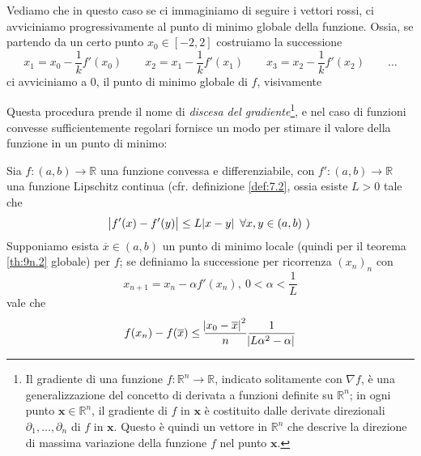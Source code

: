     Vediamo che in questo caso se ci immaginiamo di seguire i vettori rossi, ci avviciniamo progressivamente al punto di minimo globale della funzione. Ossia, se partendo da un certo punto $x_0\in [-2,2]$ costruiamo la successione
    \[
    x_1 = x_0 - \frac{1}{k}f'(x_0) \qquad x_2 = x_1 - \frac{1}{k}f'(x_1) \qquad x_3 = x_2 - \frac{1}{k}f'(x_2) \qquad \dots
    \]
    ci avviciniamo a $0$, il punto di minimo globale di $f$, visivamente
    \begin{center}
    \end{center}
    Questa procedura prende il nome di \emph{discesa del gradiente}\footnote{Il gradiente di una funzione $f\colon \mathbb{R}^n\to\mathbb{R}$, indicato solitamente con $\nabla f$, è una generalizzazione del concetto di derivata a funzioni definite su $\mathbb{R}^n$; in ogni punto $\mathbf{x}\in\mathbb{R}^n$, il gradiente di $f$ in $\mathbf{x}$ è costituito dalle derivate direzionali $\partial_1, \dots, \partial_n$ di $f$ in $\mathbf{x}$. Questo è quindi un vettore in $\mathbb{R}^n$ che descrive la direzione di massima variazione della funzione $f$ nel punto $\mathbf{x}$.}, e nel caso di funzioni convesse sufficientemente regolari fornisce un modo per stimare il valore della funzione in un punto di minimo: 
    \begin{theorem}
        \label{th:9n.4}
        Sia $f\colon(a,b)\to\mathbb{R}$ una funzione convessa e differenziabile, con $f'\colon(a,b)\to\mathbb{R}$ una funzione Lipschitz continua (cfr. definizione \ref{def:7.2}, ossia esiste $L>0$ tale che
        \[
        \abs{f'(x)-f'(y)}\le L\abs{x-y} \ \forall x,y\in(a,b) \ \text{)}
        \]
        Supponiamo esista $\overline{x}\in(a,b)$ un punto di minimo locale (quindi per il teorema \ref{th:9n.2} globale) per $f$; se definiamo la successione per ricorrenza $(x_n)_n$ con 
        \[
        x_{n+1}= x_n - \alpha f'(x_n), \ 0<\alpha<\frac{1}{L}
        \]
        vale che 
        \[
        f(x_n)-f(\overline{x}) \le \frac{\abs{x_0 - \overline{x}}^2}{n}\frac{1}{\abs{L \alpha^2-\alpha}}
        \]
    \end{theorem}
